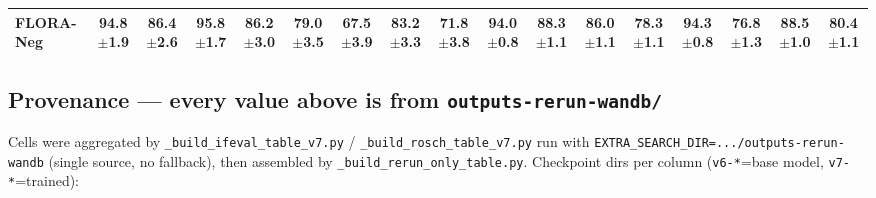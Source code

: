 \documentclass[10pt]{article}
\newcommand{\stdv}[1]{{\tiny$\pm$#1}}
\begin{document}
\begin{center}
{\begin{tabular}{l cccc cccc cccc cccc}
FLORA-Neg & 94.8\stdv{1.9} & 86.4\stdv{2.6} & 95.8\stdv{1.7} & 86.2\stdv{3.0} & 79.0\stdv{3.5} & \textbf{67.5}\stdv{3.9} & \textbf{83.2}\stdv{3.3} & 71.8\stdv{3.8} & \textbf{94.0}\stdv{0.8} & \textbf{88.3}\stdv{1.1} & 86.0\stdv{1.1} & 78.3\stdv{1.1} & 94.3\stdv{0.8} & 76.8\stdv{1.3} & 88.5\stdv{1.0} & 80.4\stdv{1.1} \\
\bottomrule
\end{tabular}}
\end{center}

\subsection*{Provenance --- every value above is from \texttt{outputs-rerun-wandb/}}
{\footnotesize Cells were aggregated by \texttt{\_build\_ifeval\_table\_v7.py} / \texttt{\_build\_rosch\_table\_v7.py} run with \texttt{EXTRA\_SEARCH\_DIR=.../outputs-rerun-wandb} (single source, no fallback), then assembled by \texttt{\_build\_rerun\_only\_table.py}. Checkpoint dirs per column (\texttt{v6-*}=base model, \texttt{v7-*}=trained):}
\end{document}
